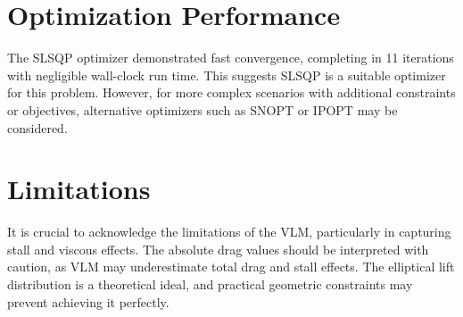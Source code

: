 \documentclass{article}
\begin{document}
\section{Optimization Performance}
The SLSQP optimizer demonstrated fast convergence, completing in 11 iterations with negligible wall-clock run time. This suggests SLSQP is a suitable optimizer for this problem. However, for more complex scenarios with additional constraints or objectives, alternative optimizers such as SNOPT or IPOPT may be considered.

\section{Limitations}
It is crucial to acknowledge the limitations of the VLM, particularly in capturing stall and viscous effects. The absolute drag values should be interpreted with caution, as VLM may underestimate total drag and stall effects. The elliptical lift distribution is a theoretical ideal, and practical geometric constraints may prevent achieving it perfectly.
\end{document}

